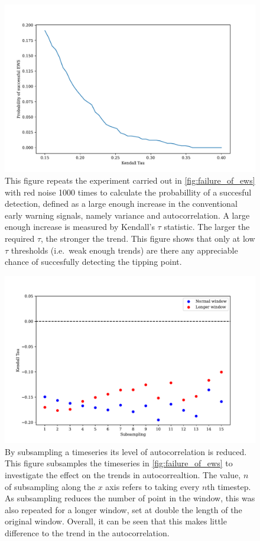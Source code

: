 \begin{figure}
  \centering
  \includegraphics[width=\textwidth]{pofsuccess}
  \caption[Probability of detection for conventional early warning signals]{This figure repeats the experiment carried out in \cref{fig:failure_of_ews}
    with red noise 1000 times to calculate the probabillity of a succesful detection, defined as a large enough increase in the conventional
    early warning signals, namely variance and autocorrelation. A large enough increase is measured by Kendall's $\tau$ statistic. The larger the
    required $\tau$, the stronger the trend. This figure shows that only at low $\tau$ thresholds (i.e.\ weak enough trends) are there any appreciable
  chance of succesfully detecting the tipping point.}
  \label{fig:prob_of_suc}
\end{figure}

\begin{figure}
  \centering
  \includegraphics[width=\textwidth]{subsampling}
  \caption[Effect of Subsampling]{By subsampling a timeseries its level of autocorrelation is reduced. This figure subsamples the timeseries in
    \cref{fig:failure_of_ews} to investigate the effect on the trends in autocorrealtion. The value, $n$ of subsampling along the $x$ axis refers to taking
    every $n$th timestep. As subsampling reduces the number of point in the window, this was also repeated for a longer window, set at double the length of the
  original window. Overall, it can be seen that this makes little difference to the trend in the autocorrelation.}
  \label{fig:subsampling}
\end{figure}


